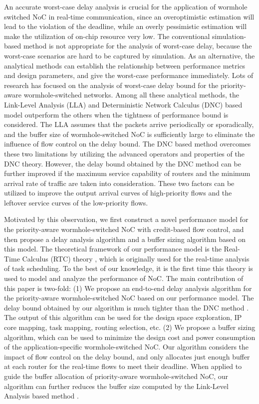 \documentclass[preprint]{elsarticle}
\begin{document}
An accurate worst-case delay analysis is crucial for the application of wormhole switched NoC in real-time communication, since an overoptimistic estimation will lead to the violation of the deadline, while an overly pessimistic estimation will make the utilization of on-chip resource very low. The conventional simulation-based method is not appropriate for the analysis of worst-case delay, because the worst-case scenarios are hard to be captured by simulation. As an alternative, the analytical methods can establish the relationship between performance metrics and design parameters, and give the worst-case performance immediately. Lots of research \cite{Shi:2008:RCA:1397757.1397996,73,Qian489900,LuJS05,707545,708526} has focused on the analysis of worst-case delay bound for the priority-aware wormhole-switched networks. Among all these analytical methods, the Link-Level Analysis (LLA) \cite{73}\cite{189} and Deterministic Network Calculus (DNC) \cite{Qian489900} based model outperform the others when the tightness of performance bound is considered. The LLA assumes that the packets arrive periodically or sporadically, and the buffer size of wormhole-switched NoC is sufficiently large to eliminate the influence of flow control on the delay bound. The DNC based method \cite{Qian489900} overcomes these two limitations by utilizing the advanced operators and properties of the DNC theory. However, the delay bound obtained by the DNC method \cite{Qian489900} can be further improved if the maximum service capability of routers and the minimum arrival rate of traffic are taken into consideration. These two factors can be utilized to improve the output arrival curves of high-priority flows and the leftover service curves of the low-priority flows.

Motivated by this observation, we first construct a novel performance model for the priority-aware wormhole-switched NoC with credit-based flow control, and then propose a delay analysis algorithm and a buffer sizing algorithm based on this model. The theoretical framework of our performance model is the Real-Time Calculus (RTC) theory \cite{1253607}, which is originally used for the real-time analysis of task scheduling. To the best of our knowledge, it is the first time this theory is used to model and analyze the performance of NoC. The main contribution of this paper is two-fold: (1) We propose an end-to-end delay analysis algorithm for the priority-aware wormhole-switched NoC based on our performance model. The delay bound obtained by our algorithm is much tighter than the DNC method \cite{Qian489900}. The output of this algorithm can be used for the design space exploration, IP core mapping, task mapping, routing selection, etc. (2) We propose a buffer sizing algorithm, which can be used to minimize the design cost and power consumption of the application-specific wormhole-switched NoC. Our algorithm considers the impact of flow control on the delay bound, and only allocates just enough buffer at each router for the real-time flows to meet their deadline. When applied to guide the buffer allocation of priority-aware wormhole-switched NoC, our algorithm can further reduces the buffer size computed by the Link-Level Analysis based method \cite{189}.
\end{document}
